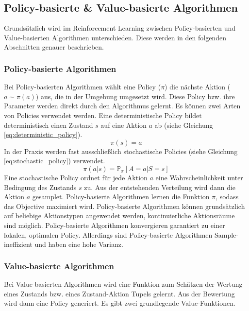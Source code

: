 \subsection{Policy-basierte \& Value-basierte Algorithmen}
Grundsätzlich wird im Reinforcement Learning zwischen Policy-basierten und Value-basierten Algorithmen unterschieden. Diese werden in den folgenden Abschnitten genauer beschrieben.

\subsubsection{Policy-basierte Algorithmen}
Bei Policy-basierten Algorithmen wählt eine Policy ($\pi$) die nächste Aktion ($a \sim \pi(a)$) aus, die in der Umgebung umgesetzt wird. Diese Policy bzw. ihre Parameter werden direkt durch den Algorithmus gelernt. Es können zwei Arten von Policies verwendet werden. Eine deterministische Policy bildet deterministisch einen Zustand $s$ auf eine Aktion $a$ ab (siehe Gleichung \ref{eq:deterministic_policy}). \cite{FoundationsDeepRL}
\begin{equation}
    \pi(s) = a
    \label{eq:deterministic_policy}
\end{equation}
In der Praxis werden fast ausschließlich stochastische Policies (siehe Gleichung \ref{eq:stochastic_policy}) verwendet.
\begin{equation}
    \pi(a\vert s) = \mathbb{P}_{\pi}\left[ A=a \vert S=s \right]
    \label{eq:stochastic_policy}
\end{equation}
Eine stochastische Policy ordnet für jede Aktion $a$ eine Wahrscheinlichkeit unter Bedingung des Zustands $s$ zu. Aus der entstehenden Verteilung wird dann die Aktion $a$ gesamplet. Policy-basierte Algorithmen lernen die Funktion $\pi$, sodass das Objective maximiert wird.
Policy-basierte Algorithmen können grundsätzlich auf beliebige Aktionstypen angewendet werden, kontinuierliche Aktionsräume sind möglich. Policy-basierte Algorithmen konvergieren garantiert zu einer lokalen, optimalen Policy. Allerdings sind Policy-basierte Algorithmen Sample-ineffizient und haben eine hohe Varianz. \cite{deepRL-2020}

\subsubsection{Value-basierte Algorithmen}
Bei Value-basierten Algorithmen wird eine Funktion zum Schätzen der Wertung eines Zustands bzw. eines Zustand-Aktion Tupels gelernt. Aus der Bewertung wird dann eine Policy generiert. Es gibt zwei grundlegende Value-Funktionen.

